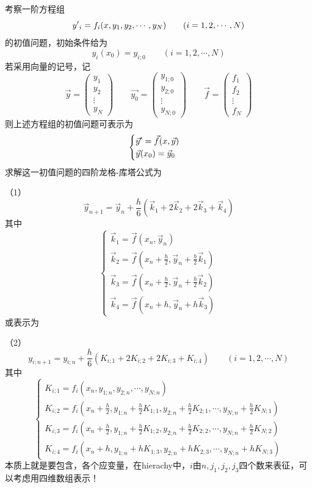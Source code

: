 考察一阶方程组
$$y\rq{}_i=f_i(x,y_1,y_2,\cdots,y_N)\qquad (i=1,2,\cdots,N)$$
的初值问题，初始条件给为
$$y_i(x_0)=y_{i;0}\qquad (i=1,2,\cdots,N)$$
若采用向量的记号，记
$$\vec{y}=\begin{pmatrix}y_1 \\ y_2 \\ \vdots \\ y_N\end{pmatrix}
\qquad
\vec{y_0}=\begin{pmatrix} y_{1;0} \\ y_{2;0} \\  \vdots \\ y_{N;0} \end{pmatrix}
\qquad
\vec{f} =\begin{pmatrix} f_1 \\ f_2 \\ \vdots \\  f_N \end{pmatrix}$$
则上述方程组的初值问题可表示为
$$\begin{cases}\vec{y}\rq{}=\vec{f}(x,\vec{y}) \\ \vec{y}(x_0)=\vec{y}_0 \end{cases}$$
求解这一初值问题的四阶龙格-库塔公式为

（1）
$$\vec{y}_{n+1}=\vec{y}_n+\frac{h}{6}(\vec{k}_1+2\vec{k}_2+2\vec{k}_3+\vec{k}_4)$$
其中
$$\begin{cases}
\vec{k}_1 = \vec{f}(x_n,\vec{y}_n)\\
\vec{k}_2 = \vec{f}(x_n+\frac{h}{2},\vec{y}_n+\frac{h}{2}\vec{k}_1)\\
\vec{k}_3 = \vec{f}(x_n+\frac{h}{2},\vec{y}_n+\frac{h}{2}\vec{k}_2)\\
\vec{k}_4=\vec{f}(x_n+h,\vec{y}_n+h\vec{k}_3) 
 \end{cases}$$
或表示为

（2）
$$y_{i;n+1}=y_{i;n}+\frac{h}{6}(K_{i;1}+2K_{i;2}+2K_{i;3}+K_{i;4}) \qquad (i=1,2,\cdots,N)$$
其中
$$\begin{cases}
K_{i;1}=f_i(x_n,y_{1;n},y_{2;n},\cdots,y_{N;n})\\
K_{i;2}=f_i(x_n+\frac{h}{2},y_{1;n}+\frac{h}{2}K_{1;1},y_{2;n}+\frac{h}{2}K_{2;1},\cdots,y_{N;n}+\frac{h}{2}K_{N;1})\\
K_{i;3}=f_i(x_n+\frac{h}{2},y_{1;n}+\frac{h}{2}K_{1;2},y_{2;n}+\frac{h}{2}K_{2;2},\cdots,y_{N;n}+\frac{h}{2}K_{N;2})\\
K_{i;4}=f_i(x_n+h,y_{1;n}+hK_{1;3},y_{2;n}+hK_{2;3},\cdots,y_{N;n}+hK_{N;3})
\end{cases}
$$
{\color{red}本质上就是要包含，各个应变量，在hierachy中，$i$由$n,j_1,j_2,j_3$四个数来表征，可以考虑用四维数组表示！}

